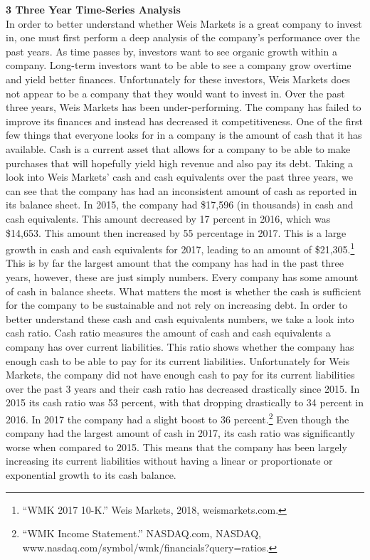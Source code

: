 \documentclass[12pt]{article}
\begin{document}
\begin{doublespacing}
\textbf{3 Three Year Time-Series Analysis}
\\
In order to better understand whether Weis Markets is a great company to invest in, one must first perform a deep analysis of the company's performance over the past years. As time passes by, investors want to see organic growth within a company. Long-term investors want to be able to see a company grow overtime and yield better finances. Unfortunately for these investors, Weis Markets does not appear to be a company that they would want to invest in. Over the past three years, Weis Markets has been under-performing. The company has failed to improve its finances and instead has decreased it competitiveness.
One of the first few things that everyone looks for in a company is the amount of cash that it has available. Cash is a current asset that allows for a company to be able to make purchases that will hopefully yield high revenue and also pay its debt. Taking a look into Weis Markets’ cash and cash equivalents over the past three years, we can see that the company has had an inconsistent amount of cash as reported in its balance sheet. In 2015, the company had \$17,596 (in thousands) in cash and cash equivalents. This amount decreased by 17 percent in 2016, which was \$14,653. This amount then increased by 55 percentage in 2017. This is a large growth in cash and cash equivalents for 2017, leading to an amount of \$21,305.\footnote{“WMK 2017 10-K.” Weis Markets, 2018, weismarkets.com.} This is by far the largest amount that the company has had in the past three years, however, these are just simply numbers. Every company has some amount of cash in balance sheets. What matters the most is whether the cash is sufficient for the company to be sustainable and not rely on increasing debt. In order to better understand these cash and cash equivalents numbers, we take a look into cash ratio. Cash ratio measures the amount of cash and cash equivalents a company has over current liabilities. This ratio shows whether the company has enough cash to be able to pay for its current liabilities. Unfortunately for Weis Markets, the company did not have enough cash to pay for its current liabilities over the past 3 years and their cash ratio has decreased drastically since 2015. In 2015 its cash ratio was 53 percent, with that dropping drastically to 34 percent in 2016. In 2017 the company had a slight boost to 36 percent.\footnote{“WMK Income Statement.” NASDAQ.com, NASDAQ, www.nasdaq.com/symbol/wmk/financials?query=ratios.} Even though the company had the largest amount of cash in 2017, its cash ratio was significantly worse when compared to 2015. This means that the company has been largely increasing its current liabilities without having a linear or proportionate or exponential growth to its cash balance.

\end{doublespacing}
\end{document}
